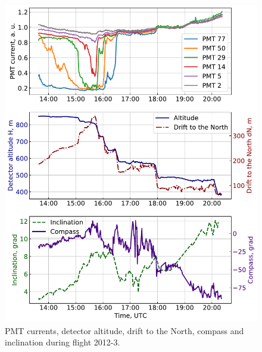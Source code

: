 \documentclass[universe,article,submit,moreauthors,pdftex]{Definitions/mdpi}
\begin{document}
\begin{figure}[tb]
    \begin{minipage}[t]{0.48\textwidth}
        \centering
        \includegraphics[width=\textwidth]{2012-3_currents_H_dN.pdf}
        \caption{PMT currents, detector altitude, drift to the North, compass and inclination during flight 2012-3.}
        \label{fig:2012-3_currents}
    \end{minipage}
    \hfill
    \begin{minipage}[t]{0.48\textwidth}
        \centering

\end{minipage}
\end{figure}
\end{document}
